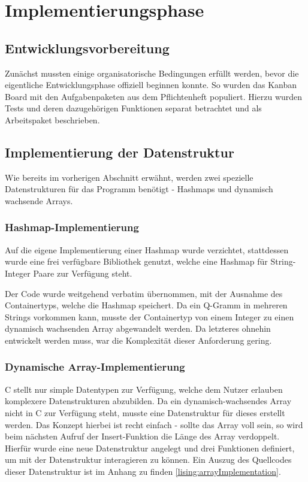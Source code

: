 \section{Implementierungsphase}

\subsection{Entwicklungsvorbereitung}
Zunächst mussten einige organisatorische Bedingungen erfüllt werden, bevor die eigentliche Entwicklungsphase offiziell beginnen konnte. So wurden das Kanban Board mit den
Aufgabenpaketen aus dem Pflichtenheft populiert. Hierzu wurden Tests und deren
dazugehörigen Funktionen separat betrachtet und als Arbeitspaket beschrieben.

\subsection{Implementierung der Datenstruktur}
Wie bereits im vorherigen Abschnitt erwähnt, werden zwei spezielle Datenstrukturen für das Programm benötigt - Hashmaps und dynamisch wachsende Arrays.

\subsubsection{Hashmap-Implementierung}


Auf die eigene Implementierung einer Hashmap wurde verzichtet, stattdessen wurde
eine frei verfügbare Bibliothek genutzt, welche eine Hashmap für
String-Integer Paare zur Verfügung steht.

Der Code wurde weitgehend verbatim übernommen, mit der Ausnahme des
Containertyps, welche die Hashmap speichert. Da ein Q-Gramm in mehreren Strings
vorkommen kann, musste der Containertyp von einem Integer zu einen dynamisch
wachsenden Array abgewandelt werden. Da letzteres ohnehin entwickelt werden muss,
war die Komplexität dieser Anforderung gering.

\subsubsection{Dynamische Array-Implementierung}
C stellt nur simple Datentypen zur Verfügung, welche dem Nutzer erlauben komplexere Datenstrukturen abzubilden. Da ein dynamisch-wachsendes
Array nicht in C zur Verfügung steht, musste eine Datenstruktur für dieses erstellt werden.
Das Konzept hierbei ist recht einfach - sollte das Array voll sein, so wird beim
nächsten Aufruf der Insert-Funktion die Länge des Array verdoppelt. Hierfür wurde eine neue Datenstruktur angelegt und drei Funktionen definiert, um mit der Datenstruktur interagieren zu können. Ein Auszug des Quellcodes dieser Datenstruktur ist im Anhang zu finden \ref{lising:arrayImplementation}.\par

\clearpage
